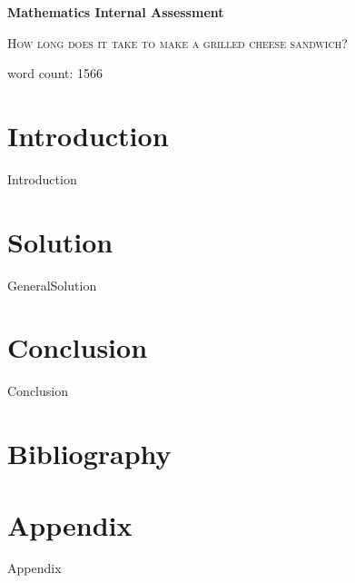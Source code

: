 \documentclass[12pt,a4paper]{article}
\numberwithin{equation}{section}
\begin{document}
 
	\begin{titlepage}
		\centering
		{\huge\bfseries Mathematics Internal Assessment \par}
		\vspace{1cm}
		{\scshape\Large How long does it take to make a grilled cheese sandwich?\par}
		{word count: 1566}
	\end{titlepage}
	
\tableofcontents
	
\section{Introduction}
{Introduction}

\section{Solution}
{GeneralSolution}

\section{Conclusion}
{Conclusion}

\section{Bibliography}


\section{Appendix}
{Appendix}
\end{document}
